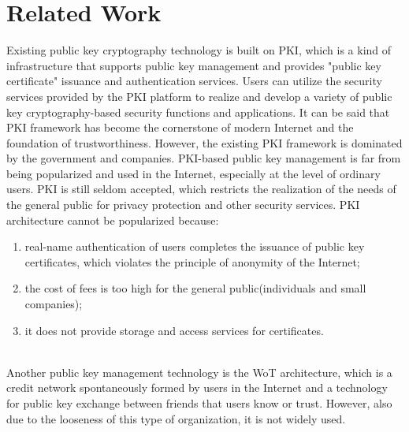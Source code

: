 \section{Related Work}
Existing public key cryptography technology is built on PKI, which is a kind of 
infrastructure that supports public key management and provides "public key certificate" 
issuance and authentication services\cite{b5}. Users can utilize the security services provided 
by the PKI platform to realize and develop a variety of public key cryptography-based 
security functions and applications\cite{b6}. It can be said that PKI framework has become the 
cornerstone of modern Internet and the foundation of trustworthiness. However, the 
existing PKI framework is dominated by the government and companies. PKI-based public 
key management is far from being popularized and used in the Internet, especially at 
the level of ordinary users. PKI is still seldom accepted, which restricts the realization 
of the needs of the general public for privacy protection and other security services\cite{b4}. 
PKI architecture cannot be popularized because\cite{b2}: 
\begin{enumerate}[]
    \item real-name authentication of users completes the issuance of public key certificates, which violates the principle of anonymity of the Internet; 
    \item the cost of fees is too high for the general public(individuals and small companies);
    \item it does not provide storage and access services for certificates.
\end{enumerate}
\\
Another public key management technology is the WoT architecture, which is a credit 
network spontaneously formed by users in the Internet and a technology for public key 
exchange between friends that users know or trust\cite{b4}. However, also due to the looseness 
of this type of organization, it is not widely used\cite{b3}.




